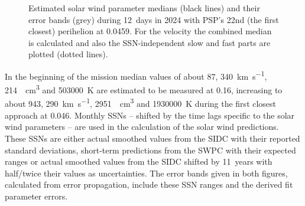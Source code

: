 \begin{figure}
	\caption{Estimated solar wind parameter medians (black lines) and their error bands (grey) during 12~days in 2024 with PSP's 22nd (the first closest) perihelion at \SI{0.0459}{\au}. For the velocity the combined median is calculated and also the SSN-independent slow and fast parts are plotted (dotted lines).}
	\label{fig:SPP_perihelia_prediction_nearest_f_plot}
\end{figure}
In the beginning of the mission median values of about \SI{87}{\nT}, \SI{340}{\km\per\s}, \SI{214}{\per\cm\cubed} and \SI{503000}{\K} are estimated to be measured at \SI{0.16}{\au}, increasing to about \SI{943}{\nT}, \SI{290}{\km\per\s}, \SI{2951}{\per\cm\cubed} and \SI{1930000}{\K} during the first closest approach at \SI{0.046}{\au}. Monthly SSNs -- shifted by the time lags specific to the solar wind parameters -- are used in the calculation of the solar wind predictions. These SSNs are either actual smoothed values from the SIDC with their reported standard deviations, short-term predictions from the SWPC with their expected ranges or actual smoothed values from the SIDC shifted by 11~years with half/twice their values as uncertainties. The error bands given in both figures, calculated from error propagation, include these SSN ranges and the derived fit parameter errors.

